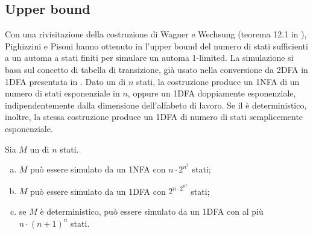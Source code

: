 \subsection{Upper bound}\label{subs:a1l:up}
Con una rivisitazione della costruzione di Wagner e Wechsung (teorema 12.1 in \cite{Wagner:86:compCompl}), Pighizzini e Pisoni hanno ottenuto in \cite{Pighizzini:14:limitedRE} l'upper bound del numero di stati sufficienti a un automa a stati finiti per simulare un automa 1-limited. La simulazione si basa sul concetto di tabella di transizione, già usato nella conversione da 2DFA in 1DFA presentata in \cite{Shepherdson:59:reduction2to1way}. Dato un  di $n$ stati, la costruzione produce un 1NFA di un numero di stati esponenziale in $n$, oppure un 1DFA doppiamente esponenziale, indipendentemente dalla dimensione dell'alfabeto di lavoro. Se il  è deterministico, inoltre, la stessa costruzione produce un 1DFA di numero di stati semplicemente esponenziale.
\begin{theor}\label{thm:a1l:upper}
	Sia $M$ un  di $n$ stati.
	\begin{enumerate}[(a)]
		\item \label{itm:a1l:up:NFA} $M$ può essere simulato da un 1NFA con $n\cdot2^{n^2}$ stati;
		\item \label{itm:a1l:up:DFA} $M$ può essere simulato da un 1DFA con $2^{n\cdot2^{n^2}}$ stati;
		\item \label{itm:a1l:up:det} se $M$ è deterministico, può essere simulato da un 1DFA con al più $n\cdot (n+1)^n$ stati.
	\end{enumerate}
\end{theor}
